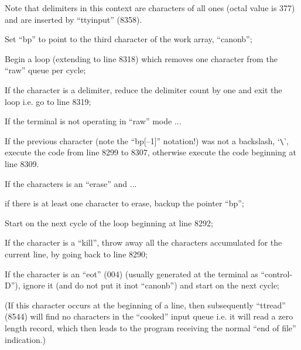 \noindent Note that delimiters in this context
are characters of all ones (octal value
is 377) and are inserted by ``ttyinput''
(8358).

\bd
\item[8291:] Set ``bp'' to point to the third
character of the work array,
``canonb'';

\item[8292:] Begin a loop (extending to line
8318) which removes one character
from the ``raw'' queue per cycle;

\item[8293:] If the character is a delimiter,
reduce the delimiter count by one
and exit the loop i.e. go to line
8319;

\item[8297:] If the terminal is not operating
in ``raw'' mode ...

\item[8298:] If the previous character (note
the ``bp[--1]'' notation!) was not a
backslash, `\verb+\+', execute the code
from line 8299 to 8307, otherwise
execute the code beginning at
line 8309.
\ed


\bd
\item[8299:] If the characters is an ``erase'' and ...

\item[8300:] if there is at least one character to
erase, backup the pointer ``bp'';

\item[8302:] Start on the next cycle of the loop
beginning at line 8292;

\item[8304:] If the character is a ``kill'',
throw away all the characters
accumulated for the current line,
by going back to line 8290;

\item[8306:] If the character is an ``eot'' (004)
(usually generated at the terminal as ``control-D''),
ignore it (and do not put it inot ``canonb'') and
start on the next cycle;

(If this character occurs at
the beginning of a line, then
subsequently ``ttread'' (8544) will
find no characters in the
``cooked'' input queue i.e. it will
read a zero length record, which
then leads to the program receiving the normal ``end of file''
indication.)
\ed


